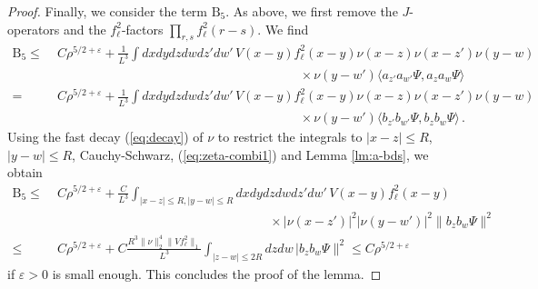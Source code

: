 \documentclass[10pt,a4paper]{amsart}
\def\eps{\varepsilon}
\begin{document}
\begin{proof}
Finally, we consider the term $\text{B}_5$. As above, we first remove the $J$-operators and the $f_\ell^2$-factors $\prod_{r,s} f_\ell^2 (r-s)$. We find 
\[ \begin{split} \text{B}_5 \leq \; &C \rho^{5/2+\eps} + \frac{1}{L^3} \int dx dy dz dw dz' dw' \, V(x-y)f_\ell^2(x-y)  \nu (x-z) \nu (x-z') \nu (y-w)  \\ &\hspace{8cm} \times \nu (y-w')\langle a_{z' }a_{w'} \Psi, a_z a_w \Psi \rangle \\ = \; &C \rho^{5/2+\eps}+ \frac{1}{L^3} \int dx dy dz dw dz' dw' \, V(x-y) f_\ell^2(x-y) \nu (x-z) \nu (x-z') \nu (y-w) \\ &\hspace{8cm} \times \nu (y-w') \langle b_{z' }b_{w'} \Psi ,b_z b_w \Psi \rangle \,. \end{split} \]
Using the fast decay (\ref{eq:decay}) of $\nu$ to restrict the integrals to $|x-z| \leq R$, $|y-w| \leq R$, Cauchy-Schwarz, (\ref{eq:zeta-combi1}) and Lemma \ref{lm:a-bds}, we obtain 
\[ \begin{split} \text{B}_5 \leq \; &C \rho^{5/2+\eps} +\frac{C}{L^3} \int_{|x-z| \leq R, |y-w| \leq R} dx dy dz dw dz' dw' \, V(x-y) f_\ell^2(x-y)\\ &\hspace{7cm} \times |\nu (x-z')|^2 |\nu (y-w')|^2  \| b_z b_w \Psi \|^2\\  \leq \; &C \rho^{5/2+\eps} + C  \frac{R^3 \| \nu \|^4_2 \|Vf_\ell^2\|_1}{L^3} \int_{|z-w| \leq 2R} dz dw \, | b_z b_w \Psi \|^2 \leq C \rho^{5/2+\eps} 
  \end{split} \]
if $\eps > 0$ is small enough. This concludes the proof of the lemma. 
\end{proof} 
\end{document}
